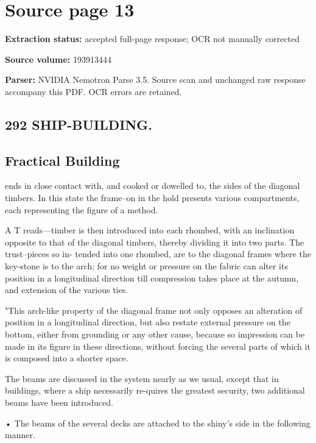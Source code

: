 \clearpage
\section{Source page 13}
\textbf{Extraction status:} accepted full-page response; OCR not manually corrected\par
\textbf{Source volume:} 193913444\par
\textbf{Parser:} NVIDIA Nemotron Parse 3.5. Source scan and unchanged raw response accompany this PDF. OCR errors are retained.\par\medskip
\subsection*{292 SHIP-BUILDING.}
\subsection*{Fractical Building}
ends in close contact with, and cooked or dowelled to, the sides of the diagonal timbers. In this state the frame--on in the hold presents various compartments, each representing the figure of a method.\par\medskip
A T reads—timber is then introduced into each rhombed, with an inclination opposite to that of the diagonal timbers, thereby dividing it into two parts. The trust--pieces so in- tended into one rhombed, are to the diagonal frames where the key-stone is to the arch; for no weight or pressure on the fabric can alter its position in a longitudinal direction till compression takes place at the autumn, and extension of the various ties.\par\medskip
"This arch-like property of the diagonal frame not only opposes an alteration of position in a longitudinal direction, but also restate external pressure on the bottom, either from grounding or any other cause, because so impression can be made in its figure in these directions, without forcing the several parts of which it is composed into a shorter space.\par\medskip
The beams are discussed in the system nearly as we usual, except that in buildings, where a ship necessarily re-quires the greatest security, two additional beams have been introduced.\par\medskip
• The beams of the several decks are attached to the shiny’s side in the following manner.\par\medskip
